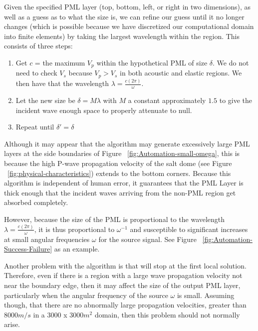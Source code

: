 Given the specified PML layer (top, bottom, left, or right in two dimensions), as well as a guess as to what the size is, we can refine our guess until it no longer changes (which is possible because we have discretized our computational domain into finite elements) by taking the largest wavelength within the region. This consists of three steps:

\begin{enumerate}
\item Get $c$ = the maximum $V_p$ within the hypothetical PML of size $\delta$. We do not need to check $V_s$ because $V_p > V_s$ in both acoustic and elastic regions. We then have that the wavelength $\lambda = \frac{c (2 \pi)}{\omega}$.
\item Let the new size be $\delta =  M \lambda$ with $M$ a constant approximately $1.5$ to give the incident wave enough space to properly attenuate to null.
\item Repeat until $\delta' = \delta$
\end{enumerate}

Although it may appear that the algorithm may generate excessively large PML layers at the side boundaries of Figure ~\ref{fig:Automation-small-omega}, this is because the high P-wave propagation velocity of the salt dome (see Figure ~\ref{fig:physical-characteristics}) extends to the bottom corners. Because this algorithm is independent of human error, it guarantees that the PML Layer is thick enough that the incident waves arriving from the non-PML region get absorbed completely. 

However, because the size of the PML is proportional to the wavelength $\lambda = \frac{c (2 \pi)}{\omega}$, it is thus proportional to $\omega^{-1}$ and susceptible to significant increases at small angular frequencies $\omega$ for the source signal. See Figure ~\ref{fig:Automation-Success-Failure} as an example.

Another problem with the algorithm is that will stop at the first local solution. Therefore, even if there is a region with a large wave propagation velocity not near the boundary edge, then it may affect the size of the output PML layer, particularly when the angular frequency of the source $\omega$ is small. Assuming though, that there are no abnormally large propagation velocities, greater than $8000 m/s$ in a $3000$ x $3000 m^2$ domain, then this problem should not normally arise.

